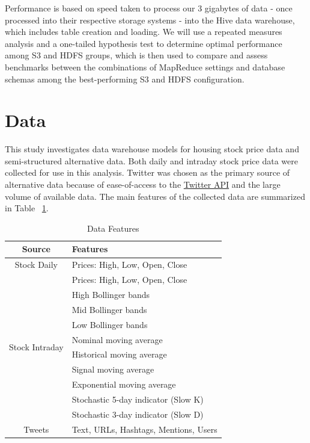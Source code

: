 \documentclass[journal]{IEEEtran}
\begin{document}
	Performance is based on speed taken to process our 3 gigabytes of data 
	- once processed into their respective storage systems - 
	into the Hive data warehouse, which includes table creation and loading. 
	We will use a repeated measures analysis and a one-tailed hypothesis 
	test to determine optimal performance among S3 and HDFS groups, 
	which is then used to compare and assess benchmarks between the 
	combinations of MapReduce settings and database schemas among the
	best-performing S3 and HDFS configuration.
	
	\section{Data}
	
	This study investigates data warehouse models for housing stock
	price data and semi-structured alternative data. 
	Both daily and intraday stock price data were collected
	for use in this analysis. 
	Twitter was chosen as the primary source of alternative data because of
	ease-of-access to the \href{https://developer.twitter.com/en/docs}{Twitter API} 
	and the large volume of available data.
	The main features of the collected data are summarized in Table ~\ref{DataFeatures}.
	
	\begin{table}
		\renewcommand{\arraystretch}{1.3}
		\caption{Data Features}
		\label{DataFeatures}
		\centering
		\begin{tabular}{c|l}
			\hline
			Source       & Features\\
			\hline
			\hline
			Stock Daily  & Prices: High, Low, Open, Close\\
			\hline
			\multirow{10}{*}{Stock Intraday} &  Prices: High, Low, Open, Close \\
			&  High Bollinger bands\\
			&  Mid Bollinger bands\\
			&  Low Bollinger bands\\ 
			&  Nominal moving average\\
			&  Historical moving average\\
			&  Signal moving average\\ 
			&  Exponential moving average\\
			&  Stochastic 5-day indicator (Slow K)\\
			&  Stochastic 3-day indicator (Slow D)\\
			\hline
			Tweets       & Text, URLs, Hashtags, Mentions, Users\\
			\hline
		\end{tabular}
	\end{table}
	
\end{document}
